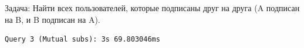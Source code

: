 \documentclass{article}
\begin{document}
Задача: Найти всех пользователей, которые подписаны друг на друга (A подписан на B, и B подписан на A).
\begin{lstlisting}[caption={analyze without indexes}, label={lst:example}]
    Query 3 (Mutual subs): 3s 69.803046ms\end{lstlisting}
\begin{lstlisting}[caption={analyze with indexes}, label={lst:example}]
    
\end{lstlisting}
\end{document}
